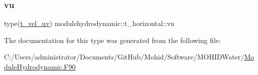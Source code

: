 \mbox{\label{structmodulehydrodynamic_1_1t__horizontal_ac822a38bf01083262c837d8c0706534b}} 
\subsubsection{\texorpdfstring{vu}{vu}}
{\footnotesize\ttfamily type(\mbox{\hyperlink{structmodulehydrodynamic_1_1t__vel__uv}{t\+\_\+vel\+\_\+uv}}) modulehydrodynamic\+::t\+\_\+horizontal\+::vu\hspace{0.3cm}{\ttfamily [private]}}



The documentation for this type was generated from the following file\+:\begin{DoxyCompactItemize}
\item 
C\+:/\+Users/administrator/\+Documents/\+Git\+Hub/\+Mohid/\+Software/\+M\+O\+H\+I\+D\+Water/\mbox{\hyperlink{_module_hydrodynamic_8_f90}{Module\+Hydrodynamic.\+F90}}\end{DoxyCompactItemize}

